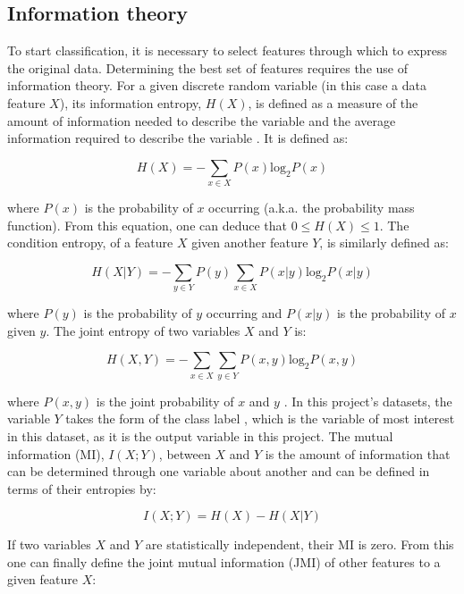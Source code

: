 \documentclass[12pt]{article}
\begin{document}
\subsection{Information theory}

To start classification, it is necessary to select features through which to express the original data. Determining the best set of features requires the use of information theory. For a given discrete random variable (in this case a data feature $X$), its information entropy, $H(X)$, is defined as a measure of the amount of information needed to describe the variable and the average information required to describe the variable \cite{bennasar2015feature}. It is defined as:

\begin{equation}
H(X)=-\sum_{x \in X}{P(x)\textrm{log}_{2}P(x)}
\end{equation}

where $P(x)$ is the probability of $x$ occurring (a.k.a. the probability mass function). From this equation, one can deduce that $0 \leqslant H(X) \leqslant 1$. The condition entropy, of a feature $X$ given another feature $Y$, is similarly defined as:

\begin{equation}
H(X|Y)=-\sum_{y \in Y}{P(y)\sum_{x \in X}{P(x|y)\textrm{log}_{2}P(x|y)}}
\end{equation}

where $P(y)$ is the probability of $y$ occurring and $P(x|y)$ is the probability of $x$ given $y$. The joint entropy of two variables $X$ and $Y$ is:

\begin{equation}
H(X,Y)=-\sum_{x \in X}\sum_{y \in Y}{P(x,y)\textrm{log}_{2}P(x,y)}
\end{equation}

where $P(x,y)$ is the joint probability of $x$ and $y$ \cite{bennasar2015feature}. In this project's datasets, the variable $Y$ takes the form of the class label \cite{lyon2016fifty}, which is the variable of most interest in this dataset, as it is the output variable in this project. The mutual information (MI), $I(X;Y)$, between $X$ and $Y$ is the amount of information that can be determined through one variable about another and can be defined in terms of their entropies by:

\begin{equation}
I(X;Y)= H(X) - H(X|Y)
\end{equation}

If two variables $X$ and $Y$ are statistically independent, their MI is zero. From this one can finally define the joint mutual information (JMI) of other features to a given feature $X$:
\end{document}
